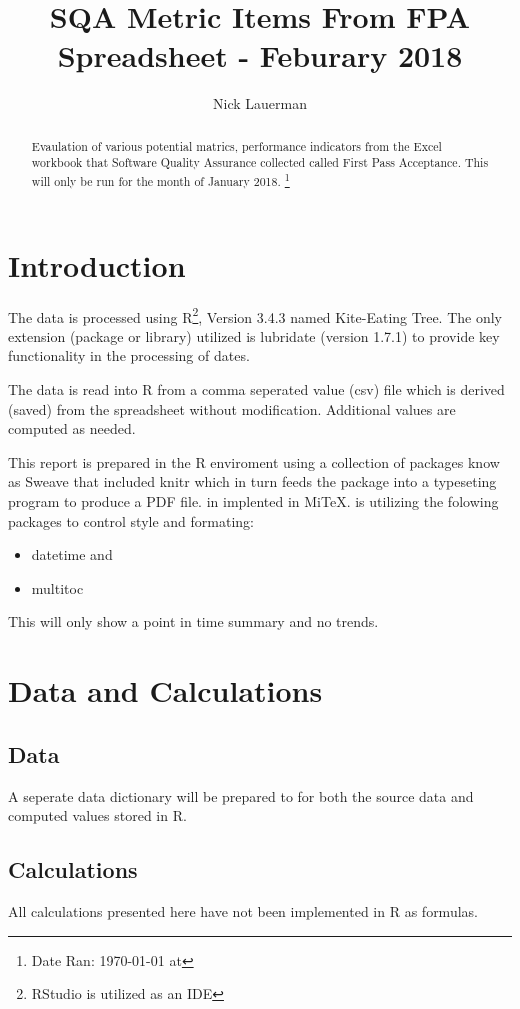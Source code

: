 \documentclass{article}
\title{SQA Metric Items From FPA Spreadsheet - Feburary 2018}
\author{Nick Lauerman}
\date{}
\begin{document}

\maketitle

\begin{abstract}
Evaulation of various potential matrics, performance indicators from the Excel
workbook that Software Quality Assurance collected called First Pass
Acceptance. This will only be run for the month of January 2018.
\footnote{Date Ran: \today{} at \currenttime}
\end{abstract}

\tableofcontents

\section{Introduction}
The data is processed using R\footnote{RStudio is utilized as an IDE}, Version
3.4.3 named Kite-Eating Tree. The only extension (package or library) utilized is
lubridate (version 1.7.1) to provide key functionality in the processing of dates.

The data is read into R from a comma seperated value (csv) file which is derived (saved)
from the spreadsheet without modification. Additional values are computed as needed.

This report is prepared in the R enviroment using a collection of packages know as
Sweave that included knitr which in turn feeds the package into \LaTeXe{} a typeseting
program to produce a PDF file. \LaTeXe{} in implented in Mi\TeX. \LaTeXe{} is utilizing
the folowing packages to control style and formating:
\begin{itemize}
\item datetime and
\item multitoc
\end{itemize}

This will only show a point in time summary and no trends.

\section{Data and Calculations}
\subsection{Data}
A seperate data dictionary will be prepared to for both the source data
and computed values stored in R.

\subsection{Calculations}
All calculations presented here have not been implemented in R as formulas.
\end{document}
